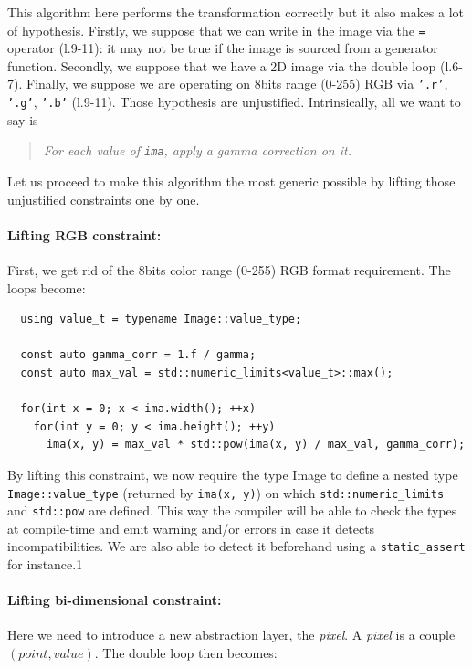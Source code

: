 \noindent This algorithm here performs the transformation correctly but it also makes a lot of hypothesis. Firstly, we
suppose that we can write in the image via the \texttt{=} operator (l.9-11): it may not be true if the image is sourced
from a generator function. Secondly, we suppose that we have a 2D image via the double loop (l.6-7). Finally, we suppose
we are operating on 8bits range (0-255) RGB via \texttt{'.r'}, \texttt{'.g'}, \texttt{'.b'} (l.9-11). Those hypothesis
are unjustified. Intrinsically, all we want to say is \blockquote{\emph{For each value of \texttt{ima}, apply a gamma
    correction on it.}}. Let us proceed to make this algorithm the most generic possible by lifting those unjustified
constraints one by one.



\paragraph{Lifting RGB constraint:}
First, we get rid of the 8bits color range (0-255) RGB format requirement. The loops become:

\begin{verbatim}
  using value_t = typename Image::value_type;

  const auto gamma_corr = 1.f / gamma;
  const auto max_val = std::numeric_limits<value_t>::max();

  for(int x = 0; x < ima.width(); ++x)
    for(int y = 0; y < ima.height(); ++y)
      ima(x, y) = max_val * std::pow(ima(x, y) / max_val, gamma_corr);
\end{verbatim}

\noindent By lifting this constraint, we now require the type Image to define a nested type \texttt{Image::value\_type}
(returned by \texttt{ima(x, y)}) on which \texttt{std::numeric\_limits} and \texttt{std::pow} are defined. This way the
compiler will be able to check the types at compile-time and emit warning and/or errors in case it detects
incompatibilities. We are also able to detect it beforehand using a \texttt{static\_assert} for instance.1



\paragraph{Lifting bi-dimensional constraint:}
Here we need to introduce a new abstraction layer, the \emph{pixel}. A \emph{pixel} is a couple $(point, value)$. The
double loop then becomes:

